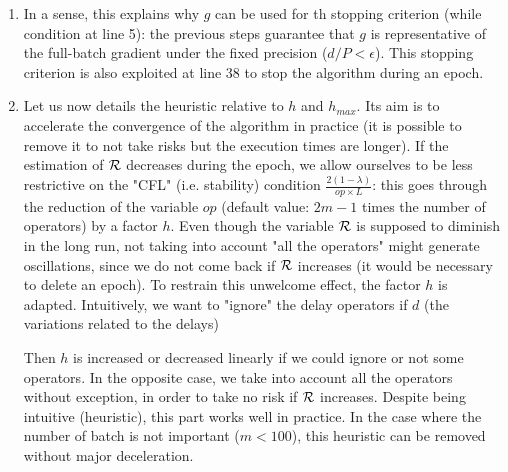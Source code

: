 \begin{enumerate}
\begin{equation*}
	\end{equation*}
	Given that the inverse of $\eta_1$ estimates the Lipschitz constant of $\nR_i$ ($\eta_1$ is chosen in place of $\eta$ since we need the contribution of batch $i$ and not their interactions), it is possible to upper bound:
	\begin{equation*}
		\|\nR_i\left(\theta_{n+i/m}\right)-\nR_i\left(\theta_{n+(i-1)/m}\right)\|
	\end{equation*}
	by the product $\frac{2(1-\lambda)}{\eta_1}\eta\|g\|$. Then this quantity gives the variations of the gradient of batch $i$ between two successive iterations. The variable
        $d$ is the sum of the variations associated to the $m$ last gradients. The smaller it is (the littlest the delays), the more accurate the estimator $g$ of $\nR$ is.
      \item In a sense, this explains why $g$ can be used for th stopping criterion (while condition at line 5): the previous steps guarantee that $g$ is representative of the
        full-batch gradient under the fixed precision ($d/P<\epsilon$). This stopping criterion is also exploited at line 38 to stop the algorithm during an epoch.   
      \item Let us now details the heuristic relative to $h$ and $h_{max}$. Its aim is to accelerate the convergence of the algorithm in practice (it is possible to remove it to not take risks but the
        execution times are longer). If the estimation of $\mathcal{R}$ decreases during the epoch, we allow ourselves to be less restrictive on the "CFL" (i.e. stability) condition $\frac{2(1-\lambda)}{op\times L}$:
          this goes through the reduction of the variable $op$ (default value: $2m-1$ times the number of operators) by a factor $h$. Even though the variable $\mathcal{R}$ is supposed to diminish
          in the long run, not taking into account "all the operators" might generate oscillations, since we do not come back if $\mathcal{R}$ increases (it would be necessary to delete an
          epoch). To restrain this unwelcome effect, the factor $h$ is adapted. Intuitively, we want to "ignore" the delay operators if $d$ (the variations related to the delays)

          Then $h$ is increased or decreased linearly if we could ignore or not some operators. In the opposite case, we take into account all the operators without exception, in order to take no risk if $\mathcal{R}$ increases. Despite being intuitive (heuristic), this part works well in practice. In the case where the number of batch is not important ($m<100$), this heuristic can be removed without major deceleration. 
\end{enumerate}    

